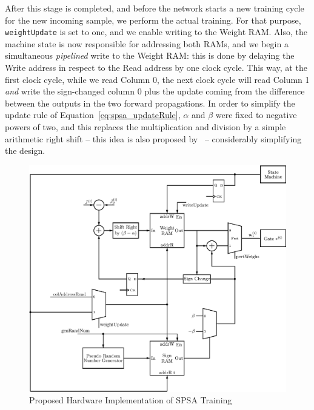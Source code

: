 After this stage is completed, and before the network starts a new training cycle for the new incoming sample, we perform the actual training. For that purpose,
\verb+weightUpdate+ is set to one, and we enable writing to the Weight RAM. Also, the machine state is now responsible for addressing both RAMs, and we
begin a simultaneous \emph{pipelined} write to the Weight RAM: this is done by delaying the Write address in respect to the Read address by one clock cycle. This way, at
the first clock cycle, while we read Column 0, the next clock cycle will read Column 1 \emph{and} write the sign-changed column 0 plus the update coming
from the difference between the outputs in the two forward propagations. In order to simplify the update rule of Equation~\ref{eq:spsa_updateRule},
$\alpha$ and $\beta$ were fixed to negative powers of two, and this replaces the multiplication and division by a simple arithmetic right shift -- this idea
is also proposed by~\cite{Maeda05} -- considerably simplifying the design.

\begin{figure}
    \centering
    \includegraphics[width=\linewidth]{figures/train.eps}
    \caption[Proposed Hardware Implementation of SPSA Training]{Proposed Hardware Implementation of SPSA Training}
    \label{fig:train}
\end{figure}
